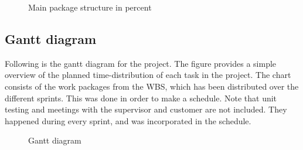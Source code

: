 \begin{center}
  \begin{figure}[ht!]
    \caption{Main package structure in percent}
    \label{fig:Main structure diagram}
  \end{figure}
\end{center}

\subsection{Gantt diagram}
\label{subsec:process_and_methodology-resource_management-gantt_diagram}

Following is the gantt diagram for the project. The figure provides a simple overview of the planned time-distribution of each task in the project. The chart consists of the work packages from the WBS, which has been distributed over the different sprints. This was done in order to make a schedule. Note that unit testing and meetings with the supervisor and customer are not included. They happened during every sprint, and was incorporated in the schedule.

\begin{center}
  \begin{figure}[ht!]
    \caption{Gantt diagram}
    \label{fig:gantt}
  \end{figure}
\end{center}

